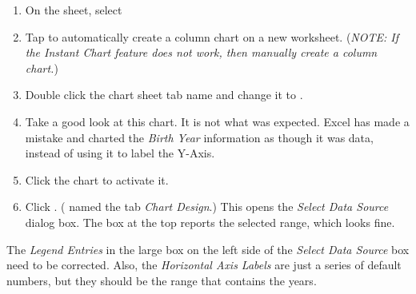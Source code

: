 \begin{enumbox}
	\begin{enumerate}
		\item On the  sheet, select 
		\item Tap  to automatically create a column chart on a new worksheet. (\textit{NOTE: If the Instant Chart feature does not work, then manually create a column chart.})
		\item Double click the chart sheet tab name and change it to .
		\item Take a good look at this chart. It is not what was expected. Excel has made a mistake and charted the \textit{Birth Year} information as though it was data, instead of using it to label the Y-Axis.
		\item Click the chart to activate it.
		\item Click . ( named the tab \textit{Chart Design}.) This opens the \textit{Select Data Source} dialog box. The box at the top reports the selected range, which looks fine. 
	\end{enumerate}
\end{enumbox}
		
The \textit{Legend Entries} in the large box on the left side of the \textit{Select Data Source} box need to be corrected. Also, the \textit{Horizontal Axis Labels} are just a series of default numbers, but they should be the range that contains the years.

